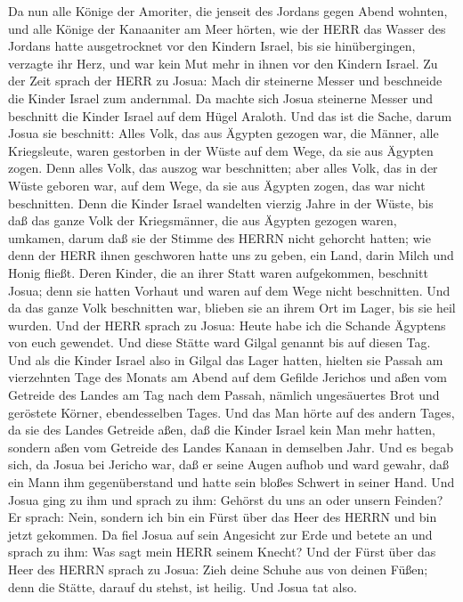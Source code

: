  Da nun alle Könige der Amoriter, die jenseit des Jordans
gegen Abend wohnten, und alle Könige der Kanaaniter am Meer hörten, wie
der HERR das Wasser des Jordans hatte ausgetrocknet vor den Kindern
Israel, bis sie hinübergingen, verzagte ihr Herz, und war kein Mut mehr
in ihnen vor den Kindern Israel.  Zu der Zeit sprach der
HERR zu Josua: Mach dir steinerne Messer und beschneide die Kinder
Israel zum andernmal.  Da machte sich Josua steinerne Messer
und beschnitt die Kinder Israel auf dem Hügel Araloth.  Und
das ist die Sache, darum Josua sie beschnitt: Alles Volk, das aus
Ägypten gezogen war, die Männer, alle Kriegsleute, waren gestorben in
der Wüste auf dem Wege, da sie aus Ägypten zogen.  Denn
alles Volk, das auszog war beschnitten; aber alles Volk, das in der
Wüste geboren war, auf dem Wege, da sie aus Ägypten zogen, das war nicht
beschnitten.  Denn die Kinder Israel wandelten vierzig Jahre
in der Wüste, bis daß das ganze Volk der Kriegsmänner, die aus Ägypten
gezogen waren, umkamen, darum daß sie der Stimme des HERRN nicht
gehorcht hatten; wie denn der HERR ihnen geschworen hatte uns zu geben,
ein Land, darin Milch und Honig fließt.  Deren Kinder, die
an ihrer Statt waren aufgekommen, beschnitt Josua; denn sie hatten
Vorhaut und waren auf dem Wege nicht beschnitten.  Und da
das ganze Volk beschnitten war, blieben sie an ihrem Ort im Lager, bis
sie heil wurden.  Und der HERR sprach zu Josua: Heute habe
ich die Schande Ägyptens von euch gewendet. Und diese Stätte ward Gilgal
genannt bis auf diesen Tag.  Und als die Kinder Israel also
in Gilgal das Lager hatten, hielten sie Passah am vierzehnten Tage des
Monats am Abend auf dem Gefilde Jerichos  und aßen vom
Getreide des Landes am Tag nach dem Passah, nämlich ungesäuertes Brot
und geröstete Körner, ebendesselben Tages.  Und das Man
hörte auf des andern Tages, da sie des Landes Getreide aßen, daß die
Kinder Israel kein Man mehr hatten, sondern aßen vom Getreide des Landes
Kanaan in demselben Jahr.  Und es begab sich, da Josua bei
Jericho war, daß er seine Augen aufhob und ward gewahr, daß ein Mann ihm
gegenüberstand und hatte sein bloßes Schwert in seiner Hand. Und Josua
ging zu ihm und sprach zu ihm: Gehörst du uns an oder unsern Feinden?
 Er sprach: Nein, sondern ich bin ein Fürst über das Heer
des HERRN und bin jetzt gekommen. Da fiel Josua auf sein Angesicht zur
Erde und betete an und sprach zu ihm: Was sagt mein HERR seinem Knecht?
 Und der Fürst über das Heer des HERRN sprach zu Josua:
Zieh deine Schuhe aus von deinen Füßen; denn die Stätte, darauf du
stehst, ist heilig. Und Josua tat also.

